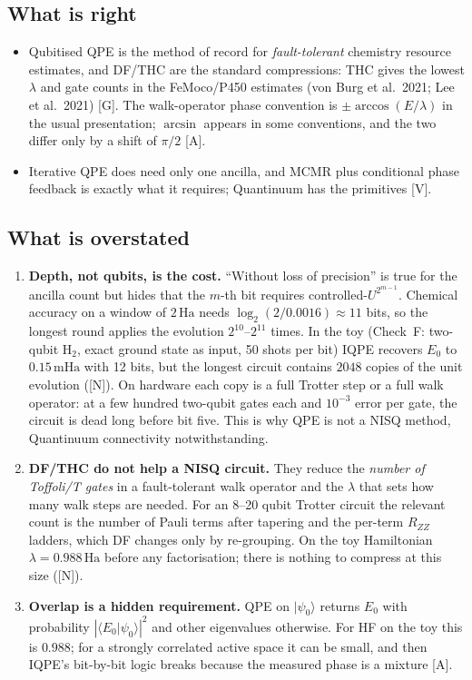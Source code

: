 \documentclass[11pt,a4paper]{article}
\newcommand{\ket}[1]{\lvert #1\rangle}
\newcommand{\braket}[2]{\langle #1\vert #2\rangle}
\newcommand{\mHa}{\,\mathrm{mHa}}
\newcommand{\Ha}{\,\mathrm{Ha}}
\newcommand{\lV}{\textcolor{keyblue}{[V]}}   %
\newcommand{\lA}{\textcolor{notegray}{[A]}}  %
\newcommand{\lG}{\textcolor{alertred}{[G]}}  %
\newcommand{\lN}{\textcolor{keyblue}{[N]}}   %
\begin{document}
\subsection{What is right}
\begin{itemize}
\item Qubitised QPE is the method of record for \emph{fault-tolerant} chemistry resource estimates, and DF/THC are the standard compressions: THC gives the lowest $\lambda$ and gate counts in the FeMoco/P450 estimates (von Burg et al.\ 2021; Lee et al.\ 2021) \lG. The walk-operator phase convention is $\pm\arccos(E/\lambda)$ in the usual presentation; $\arcsin$ appears in some conventions, and the two differ only by a shift of $\pi/2$ \lA.
\item Iterative QPE does need only one ancilla, and MCMR plus conditional phase feedback is exactly what it requires; Quantinuum has the primitives \lV.
\end{itemize}

\subsection{What is overstated}
\begin{enumerate}
\item \textbf{Depth, not qubits, is the cost.} ``Without loss of precision'' is true for the ancilla count but hides that the $m$-th bit requires controlled-$U^{2^{m-1}}$. Chemical accuracy on a window of $2\Ha$ needs $\log_2(2/0.0016)\approx 11$ bits, so the longest round applies the evolution $2^{10}$--$2^{11}$ times. In the toy (Check~F: two-qubit H$_2$, exact ground state as input, 50 shots per bit) IQPE recovers $E_0$ to $0.15\mHa$ with 12 bits, but the longest circuit contains $2048$ copies of the unit evolution (\lN). On hardware each copy is a full Trotter step or a full walk operator: at a few hundred two-qubit gates each and $10^{-3}$ error per gate, the circuit is dead long before bit five. This is why QPE is not a NISQ method, Quantinuum connectivity notwithstanding.
\item \textbf{DF/THC do not help a NISQ circuit.} They reduce the \emph{number of Toffoli/T gates} in a fault-tolerant walk operator and the $\lambda$ that sets how many walk steps are needed. For an 8--20 qubit Trotter circuit the relevant count is the number of Pauli terms after tapering and the per-term $R_{ZZ}$ ladders, which DF changes only by re-grouping. On the toy Hamiltonian $\lambda=0.988\Ha$ before any factorisation; there is nothing to compress at this size (\lN).
\item \textbf{Overlap is a hidden requirement.} QPE on $\ket{\psi_0}$ returns $E_0$ with probability $|\braket{E_0}{\psi_0}|^2$ and other eigenvalues otherwise. For HF on the toy this is $0.988$; for a strongly correlated active space it can be small, and then IQPE's bit-by-bit logic breaks because the measured phase is a mixture \lA.
\end{enumerate}
\end{document}
